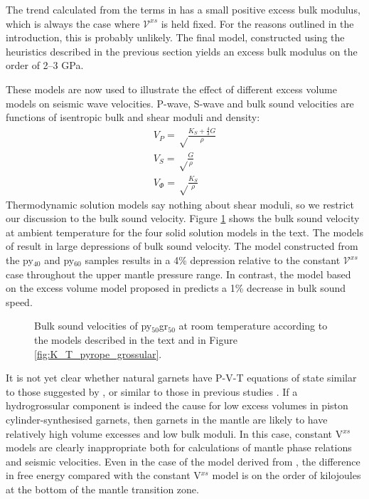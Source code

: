 The trend calculated from the terms in \cite{GCT1996} has a small positive excess bulk modulus, which is always the case where $\mathcal{V}^{xs}$ is held fixed. For the reasons outlined in the introduction, this is probably unlikely. The final model, constructed using the heuristics described in the previous section yields an excess bulk modulus on the order of 2--3 GPa.

These models are now used to illustrate the effect of different excess volume models on seismic wave velocities. P-wave, S-wave and bulk sound velocities are functions of isentropic bulk and shear moduli and density:
\begin{eqnarray}
V_P = \sqrt \frac{K_S + \frac{4}{3} G }{\rho} \\
V_S = \sqrt \frac{G}{\rho} \\
V_\Phi = \sqrt \frac{K_S}{\rho}
\end{eqnarray}
Thermodynamic solution models say nothing about shear moduli, so we restrict our discussion to the bulk sound velocity. Figure \ref{fig:bulk_sound_garnet} shows the bulk sound velocity at ambient temperature for the four solid solution models in the text. The models of \cite{DCW2015} result in large depressions of bulk sound velocity. The model constructed from the py$_{40}$ and py$_{60}$ samples results in a 4\% depression relative to the constant $\mathcal{V}^{xs}$ case throughout the upper mantle pressure range. In contrast, the model based on the excess volume model proposed in \cite{GCT1996} predicts a 1\% decrease in bulk sound speed. 

\begin{figure}[ht!]
  \centering
  \caption{Bulk sound velocities of py$_{50}$gr$_{50}$ at room temperature according to the models described in the text and in Figure \ref{fig:K_T_pyrope_grossular}.}
  \label{fig:bulk_sound_garnet}
\end{figure}

It is not yet clear whether natural garnets have P-V-T equations of state similar to those suggested by \cite{DCW2015}, or similar to those in previous studies \citep{NCK1977, BG1997, GCT1996}. If a hydrogrossular component is indeed the cause for low excess volumes in piston cylinder-synthesised garnets, then garnets in the mantle are likely to have relatively high volume excesses and low bulk moduli. In this case, constant V$^{xs}$ models are clearly inappropriate both for calculations of mantle phase relations and seismic velocities. Even in the case of the model derived from \cite{GCT1996}, the difference in free energy compared with the constant V$^{xs}$ model is on the order of kilojoules at the bottom of the mantle transition zone. 

